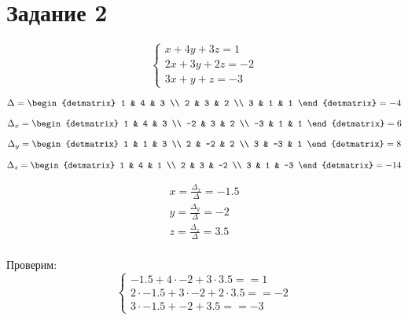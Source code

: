 \documentclass[12pt, a4paper]{article}
\begin{document}
 
    \section{Задание 2}


    \begin{equation}
        \begin{cases}
            x + 4y + 3z = 1 \\
            2x + 3y + 2z = -2 \\
            3x + y + z = -3
        \end{cases}
    \end{equation}

    \begin{equation}
        \Delta = \begin{detmatrix}
            1 & 4 & 3 \\
            2 & 3 & 2 \\
            3 & 1 & 1
        \end{detmatrix} = -4
    \end{equation}

    \begin{equation}
        \Delta_x = \begin{detmatrix}
            1 & 4 & 3 \\
            -2 & 3 & 2 \\
            -3 & 1 & 1
        \end{detmatrix} = 6
    \end{equation}

    \begin{equation}
        \Delta_y = \begin{detmatrix}
            1 & 1 & 3 \\
            2 & -2 & 2 \\
            3 & -3 & 1
        \end{detmatrix} = 8
    \end{equation}


    \begin{equation}
        \Delta_z = \begin{detmatrix}
            1 & 4 & 1 \\
            2 & 3 & -2 \\
            3 & 1 & -3
        \end{detmatrix} = -14
    \end{equation}

    \begin{gather}
        x = \frac{\Delta_x}{\Delta} = -1.5 \\
        y = \frac{\Delta_y}{\Delta} = -2 \\
        z = \frac{\Delta_z}{\Delta} = 3.5 \\
    \end{gather}

    Проверим:
    \begin{equation}
        \begin{cases}
            -1.5 + 4 \cdot -2 + 3 \cdot 3.5 == 1 \\
            2 \cdot -1.5 + 3 \cdot -2 + 2 \cdot 3.5 == -2 \\
            3 \cdot -1.5 +  -2 + 3.5 == -3
        \end{cases}
    \end{equation}
\end{document}
